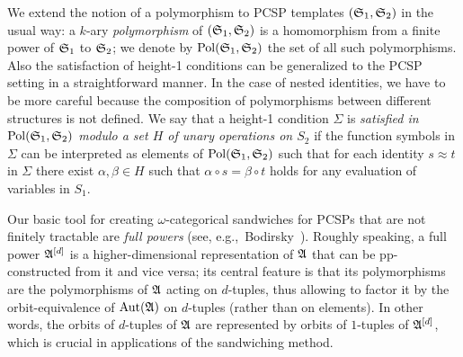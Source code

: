 We extend the notion of a polymorphism to PCSP templates $(\mathfrak{S}_1,\mathfrak{S}_2)$ in the usual way:
%
a $k$-ary \emph{polymorphism} of $(\mathfrak{S}_1,\mathfrak{S}_2)$  is a homomorphism from a finite power of $\mathfrak{S}_1$ to $\mathfrak{S}_2$;
%  
we denote by $\mathrm{Pol}(\mathfrak{S}_1,\mathfrak{S}_2)$ the set of all such polymorphisms. 
%  
Also the satisfaction of height-1 conditions can be generalized to the PCSP setting in a straightforward manner.
%
In the case of nested identities, we have to be more careful because the composition of polymorphisms between different structures is not defined.
%  
We say that a height-1 condition $\Sigma$ is \emph{satisfied in  $\mathrm{Pol}(\mathfrak{S}_1,\mathfrak{S}_2)$ modulo a set $H$ of unary operations on $S_2$} if the function symbols in $\Sigma$ can be interpreted as elements of $\mathrm{Pol}(\mathfrak{S}_1,\mathfrak{S}_2)$ such that for each identity $s \approx t$ in $\Sigma$ there exist $\alpha,\beta\in H$ such that $\alpha\circ s =\beta \circ t$ holds for any evaluation of variables in $S_1$.
% 
 
    Our basic tool for creating $\omega$-categorical sandwiches for PCSPs that are not finitely tractable are  \emph{full powers} (see, e.g.,~Bodirsky~\cite[Section~3.5]{bodirsky2021complexity}).
    Roughly speaking, a full power ${\mathfrak{A}}^{[d]}$ is a higher-dimensional representation of $\mathfrak{A}$ that can be pp-constructed from it and vice versa; its central feature is that its polymorphisms are the polymorphisms of $\mathfrak{A}$ acting on $d$-tuples, thus allowing to factor it by the orbit-equivalence of $\mathrm{Aut}(\mathfrak{A})$ on $d$-tuples (rather than on elements). 
     In other words, the orbits of $d$-tuples of $\mathfrak{A}$ are represented by orbits of $1$-tuples of ${\mathfrak{A}}^{[d]}$, which is crucial in applications of the sandwiching method. 
    
